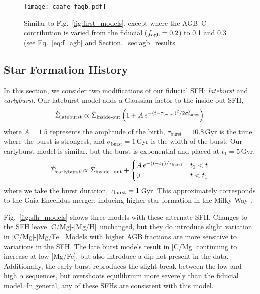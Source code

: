 \documentclass[fleqn,usenatbib]{mnras}
\newcommand{\agb}{AGB}
\newcommand{\sfh}{SFH}
\newcommand{\caah}{[C/Mg]-[Mg/H]}
\newcommand{\caafe}{[C/Mg]-[Mg/Fe]}
\begin{document}
\begin{figure}
\centering
\texttt{[image: caafe\_fagb.pdf]}

\caption[]{Similar to Fig.~\ref{fig:first_models}, except where the \agb\ C contribution is varied from the fiducial ($f_{\rm agb}=0.2$) to 0.1 and 0.3 (see Eq.~\ref{eq:f_agb} and Section.~\ref{sec:agb_results}.}
\label{fig:f_agb}
\end{figure}




\subsection{Star Formation History} \label{sec:sfh}

In this section, we consider two modifications of our fiducial \sfh{}: \textit{lateburst} and \textit{earlyburst}.
Our lateburst model adds a Gaussian factor to the inside-out \sfh{},
\begin{equation}\label{eq:late-burst}
    \dot{\Sigma}_\text{lateburst} \propto \dot{\Sigma}_\text{inside-out} \left(1 + A\,e^{-(t-\tau_{\rm burst})^2/2\sigma^2_{\rm burst}} \right)
\end{equation}
where $A=1.5$ represents the amplitude of the birth, $\tau_\text{burst}=10.8$\,Gyr is the time where the burst is strongest, and $\sigma_\text{burst}=1$\,Gyr is the width of the burst.
Our earlyburst model is similar, but the burst is exponential and placed at $t_1=5$\,Gyr. 
\begin{equation}\label{eq:twoinfall}
    \dot{\Sigma}_{\rm earlyburst} \propto \dot{\Sigma}_{\rm inside-out} + 
\begin{cases}
    A\,e^{-(t-t_1)/\tau_{\rm burst}} & t_1 < t \\
      0 & t<t_1
\end{cases}
\end{equation}
where we take the burst duration, $\tau_{\rm burst}=1$\,Gyr.
This approximately corresponds to the Gaia-Encelidus merger, inducing higher star formation in the Milky Way \citep{spitoni21, bonaca20, helmi18}.

Fig.~\ref{fig:sfh_models} shows three models with these alternate \sfh{}. Changes to the \sfh{} leave \caah\ unchanged, but they do introduce slight variation in \caafe. Models with higher \agb{} fractions are more sensitive to variations in the \sfh{}. The late burst models result in [C/Mg] continuing to increase at low [Mg/Fe], but also introduce a dip not present in the data. Additionally, the early burst
reproduces the slight break between the low and high $\alpha$ sequences, but overshoots equilibrium more severely than the fiducial model. 
In general, any of these \sfh{}s are consistent with this model.
\end{document}
